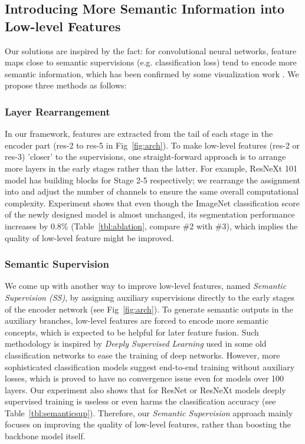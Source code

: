 \documentclass[runningheads]{llncs}
\begin{document}
\subsection{Introducing More Semantic Information into Low-level Features}
\label{sec:tolowlevel}

Our solutions are inspired by the fact: for convolutional neural networks, feature maps close to semantic supervisions (e.g. classification loss) tend to encode more semantic information, which has been confirmed by some visualization work \cite{zeiler2014visualizing}. We propose three methods as follows:

\subsubsection{Layer Rearrangement}
\label{sec:lr}

In our framework, features are extracted from the tail of each stage in the encoder part (res-2 to res-5 in Fig~\ref{fig:arch}). To make low-level features (res-2 or res-3) 'closer' to the supervisions, one straight-forward approach is to arrange more layers in the early stages rather than the latter. For example, ResNeXt 101 \cite{Xie2016Aggregated} model has  building blocks for Stage 2-5 respectively; we rearrange the assignment into  and adjust the number of channels to ensure the same overall computational complexity. Experiment shows that even though the ImageNet classification score of the newly designed model is almost unchanged, its segmentation performance increases by 0.8\% (Table~\ref{tbl:ablation}, compare \#2 with \#3), which implies the quality of low-level feature might be improved.  


\subsubsection{Semantic Supervision}
\label{sec:semanticsupervision}

We come up with another way to improve low-level features, named \emph{Semantic Supervision (SS)}, by assigning auxiliary supervisions directly to the early stages of the encoder network (see Fig~\ref{fig:arch}). To generate semantic outputs in the auxiliary branches, low-level features are forced to encode more semantic concepts, which is expected to be helpful for later feature fusion. Such methodology is inspired by \emph{Deeply Supervised Learning} used in some old classification networks \cite{Lee2014Deeply,Szegedy2015Going} to ease the training of deep networks. However, more sophisticated classification models \cite{szegedy2016rethinking,szegedy2017inception,He2016Deep,He2016Identity,hu2017squeeze,Xie2016Aggregated} suggest end-to-end training without auxiliary losses, which is proved to have no convergence issue even for models over 100 layers. Our experiment also shows that for ResNet or ResNeXt models deeply supervised training is useless or even harms the classification accuracy (see Table~\ref{tbl:semanticsup}). Therefore, our \emph{Semantic Supervision} approach mainly focuses on improving the quality of low-level features, rather than boosting the backbone model itself.
\end{document}
